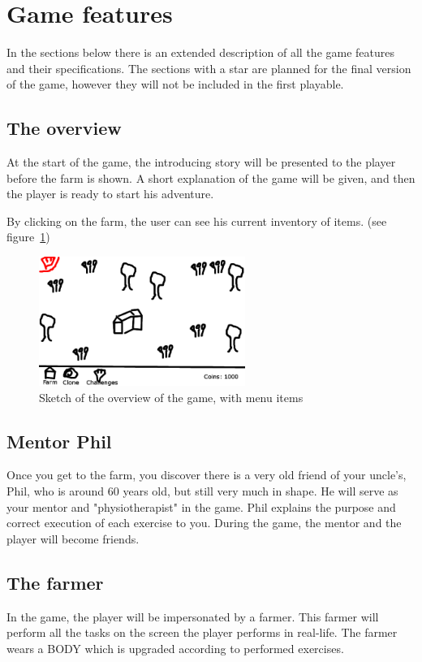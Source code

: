 \documentclass[a4paper,11pt,notitlepage]{report}
\begin{document}
\section{Game features}
In the sections below there is an extended description of all the game features and their specifications. The sections with a star are planned for the final version of the game, however they will not be included in the first playable. 

\subsection{The overview}
At the start of the game, the introducing story will be presented to the player before the farm is shown. A short explanation of the game will be given, and then the player is ready to start his adventure.

By clicking on the farm, the user can see his current inventory of items. (see figure~\ref{fig:sketch-overview})

\begin{figure}[h]
	\centering
		\includegraphics[width=0.60\textwidth]{Images/sketch-overview.png}
	\caption{Sketch of the overview of the game, with menu items}
	\label{fig:sketch-overview}
\end{figure}

\subsection{Mentor Phil}
Once you get to the farm, you discover there is a very old friend of your uncle's, Phil, who is around 60 years old, but still very much in shape. He will serve as your mentor and "physiotherapist" in the game. Phil explains the purpose and correct execution of each exercise to you. During the game, the mentor and the player will become friends.

\subsection{The farmer}
In the game, the player will be impersonated by a farmer. This farmer will perform all the tasks on the screen the player performs in real-life. The farmer wears a BODY which is upgraded according to performed exercises.
\end{document}
